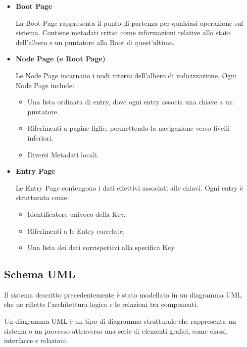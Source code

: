 \documentclass[12pt,a4paper,openright,twoside]{book}
\begin{document}
            \begin{itemize}
                \item \textbf{Boot Page}

                La Boot Page rappresenta il punto di partenza per qualsiasi operazione sul sistema. Contiene metadati critici come informazioni relative allo stato dell'albero e un puntatore alla Root di quest'ultimo.

                \item \textbf{Node Page (e Root Page)}

                Le Node Page incarnano i nodi interni dell’albero di indicizzazione. Ogni Node Page include:
                \begin{itemize}
                    \item Una lista ordinata di entry, dove ogni entry associa una chiave a un puntatore.
                    \item Riferimenti a pagine figlie, permettendo la navigazione verso livelli inferiori.
                    \item Diversi Metadati locali.
                \end{itemize}

                \item \textbf{Entry Page}

                Le Entry Page contengono i dati effettivi associati alle chiavi. Ogni entry è strutturata come:
                \begin{itemize}
                    \item Identificatore univoco della Key.
                    \item Riferimenti a le Entry correlate.
                    \item Una lista dei dati corrispettivi alla specifica Key
                \end{itemize}

            \end{itemize}

        \subsection{Schema UML}

            Il sistema descritto precedentemente è stato modellato in un diagramma UML che ne riflette l’architettura logica e le relazioni tra componenti.

            Un diagramma UML è un tipo di diagramma strutturale che rappresenta un sistema o un processo attraverso una serie di elementi grafici, come classi, interfacce e relazioni.
\end{document}
